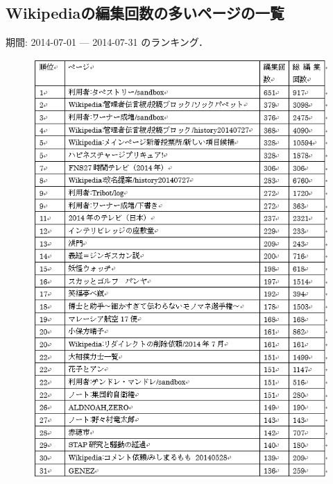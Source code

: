 \subsection{Wikipediaの編集回数の多いページの一覧}

期間: 2014-07-01 — 2014-07-31 のランキング．


\begin{figure}[H]
\centering
\includegraphics[width=12cm]{sample6.png}

\end{figure}


